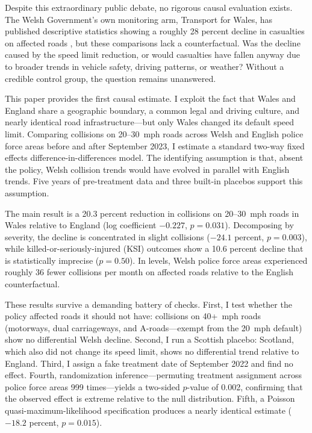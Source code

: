 \documentclass[12pt]{article}
\begin{document}
Despite this extraordinary public debate, no rigorous causal evaluation exists. The Welsh Government's own monitoring arm, Transport for Wales, has published descriptive statistics showing a roughly 28 percent decline in casualties on affected roads \citep{tfw2025}, but these comparisons lack a counterfactual. Was the decline caused by the speed limit reduction, or would casualties have fallen anyway due to broader trends in vehicle safety, driving patterns, or weather? Without a credible control group, the question remains unanswered.

This paper provides the first causal estimate. I exploit the fact that Wales and England share a geographic boundary, a common legal and driving culture, and nearly identical road infrastructure---but only Wales changed its default speed limit. Comparing collisions on 20--30~mph roads across Welsh and English police force areas before and after September 2023, I estimate a standard two-way fixed effects difference-in-differences model. The identifying assumption is that, absent the policy, Welsh collision trends would have evolved in parallel with English trends. Five years of pre-treatment data and three built-in placebos support this assumption.

The main result is a 20.3 percent reduction in collisions on 20--30~mph roads in Wales relative to England (log coefficient $-0.227$, $p = 0.031$). Decomposing by severity, the decline is concentrated in slight collisions ($-24.1$ percent, $p = 0.003$), while killed-or-seriously-injured (KSI) outcomes show a 10.6 percent decline that is statistically imprecise ($p = 0.50$). In levels, Welsh police force areas experienced roughly 36 fewer collisions per month on affected roads relative to the English counterfactual.

These results survive a demanding battery of checks. First, I test whether the policy affected roads it should not have: collisions on 40+~mph roads (motorways, dual carriageways, and A-roads---exempt from the 20~mph default) show no differential Welsh decline. Second, I run a Scottish placebo: Scotland, which also did not change its speed limit, shows no differential trend relative to England. Third, I assign a fake treatment date of September 2022 and find no effect. Fourth, randomization inference---permuting treatment assignment across police force areas 999 times---yields a two-sided $p$-value of 0.002, confirming that the observed effect is extreme relative to the null distribution. Fifth, a Poisson quasi-maximum-likelihood specification produces a nearly identical estimate ($-18.2$ percent, $p = 0.015$).
\end{document}
